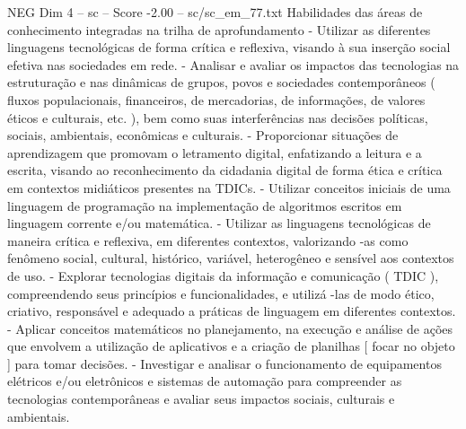 \begin{textsample}{NEG Dim 4 – sc – Score -2.00 – sc/sc\_em\_77.txt}
Habilidades das áreas de conhecimento integradas na trilha de aprofundamento - Utilizar as diferentes linguagens tecnológicas de forma crítica e reflexiva, visando à sua inserção social efetiva nas sociedades em rede. - Analisar e avaliar os impactos das tecnologias na estruturação e nas dinâmicas de grupos, povos e sociedades contemporâneos ( fluxos populacionais, financeiros, de mercadorias, de informações, de valores éticos e culturais, etc. ), bem como suas interferências nas decisões políticas, sociais, ambientais, econômicas e culturais. - Proporcionar situações de aprendizagem que promovam o letramento digital, enfatizando a leitura e a escrita, visando ao reconhecimento da cidadania digital de forma ética e crítica em contextos midiáticos presentes na TDICs. - Utilizar conceitos iniciais de uma linguagem de programação na implementação de algoritmos escritos em linguagem corrente e/ou matemática. - Utilizar as linguagens tecnológicas de maneira crítica e reflexiva, em diferentes contextos, valorizando -as como fenômeno social, cultural, histórico, variável, heterogêneo e sensível aos contextos de uso. - Explorar tecnologias digitais da informação e comunicação ( TDIC ), compreendendo seus princípios e funcionalidades, e utilizá -las de modo ético, criativo, responsável e adequado a práticas de linguagem em diferentes contextos. - Aplicar conceitos matemáticos no planejamento, na execução e análise de ações que envolvem a utilização de aplicativos e a criação de planilhas [ focar no objeto ] para tomar decisões. - Investigar e analisar o funcionamento de equipamentos elétricos e/ou eletrônicos e sistemas de automação para compreender as tecnologias contemporâneas e avaliar seus impactos sociais, culturais e ambientais.

\end{textsample}
